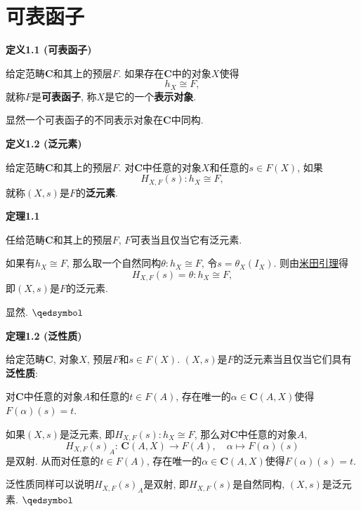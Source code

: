 \documentclass[UTF8]{ctexart}
\begin{document}
\setlength{\abovedisplayskip}{1pt}
\setlength{\belowdisplayskip}{1pt}

\section{可表函子}

\hypertarget{sec:定义1.1}{}
\noindent\textbf{定义1.1 (可表函子)}

给定范畴$\mathbf{C}$和其上的预层$F$. 如果存在$\mathbf{C}$中的对象$X$使得
\[
    h_X\cong F,
\]
就称$F$是\textbf{可表函子}, 称$X$是它的一个\textbf{表示对象}.

\vspace{10pt}

显然一个可表函子的不同表示对象在$\mathbf{C}$中同构.

\vspace{10pt}

\hypertarget{sec:定义1.2}{}
\noindent\textbf{定义1.2 (泛元素)}

给定范畴$\mathbf{C}$和其上的预层$F$.
对$\mathbf{C}$中任意的对象$X$和任意的$s\in F(X)$, 如果
\[
    H_{X,F}(s):h_X\cong F,
\]
就称$(X,s)$是$F$的\textbf{泛元素}.

\vspace{10pt}

\hypertarget{sec:定理1.1}{}
\noindent\textbf{定理1.1}

任给范畴$\mathbf{C}$和其上的预层$F$, $F$可表当且仅当它有泛元素.



如果有$h_X\cong F$, 那么取一个自然同构$\theta:h_X\cong F$, 令$s=\theta_X(I_X)$.
则由\href{02 米田引理#nameddest=sec:定理2.1}{米田引理}得
\[
    H_{X,F}(s)=\theta:h_X\cong F,
\]
即$(X,s)$是$F$的泛元素.

 显然. \hfill $\qedsymbol$

\vspace{10pt}

\hypertarget{sec:定理1.2}{}
\noindent\textbf{定理1.2 (泛性质)}

给定范畴$\mathbf{C}$, 对象$X$, 预层$F$和$s\in F(X)$.
$(X,s)$是$F$的泛元素当且仅当它们具有\textbf{泛性质}:

对$\mathbf{C}$中任意的对象$A$和任意的$t\in F(A)$,
存在唯一的$\alpha\in\mathbf{C}(A,X)$使得$F(\alpha)(s)=t$.



如果$(X,s)$是泛元素, 即$H_{X,F}(s):h_X\cong F$, 那么对$\mathbf{C}$中任意的对象$A$,
\[
    H_{X,F}(s)_A:\,\mathbf{C}(A,X)\to F(A),\quad\alpha\mapsto F(\alpha)(s)
\]
是双射. 从而对任意的$t\in F(A)$,
存在唯一的$\alpha\in\mathbf{C}(A,X)$使得$F(\alpha)(s)=t$.


泛性质同样可以说明$H_{X,F}(s)_A$是双射, 即$H_{X,F}(s)$是自然同构,
$(X,s)$是泛元素. \hfill $\qedsymbol$

\end{document}
